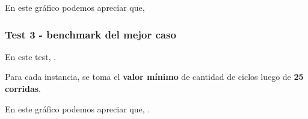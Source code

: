 
\vspace*{0.5cm}

En este gráfico podemos apreciar que, 


\newpage


\subsubsection{Test 3 - benchmark del mejor caso}

En este test, .

Para cada instancia, se toma el \textbf{valor mínimo} de cantidad de ciclos luego de \textbf{25 corridas}.




En este gráfico podemos apreciar que, .
